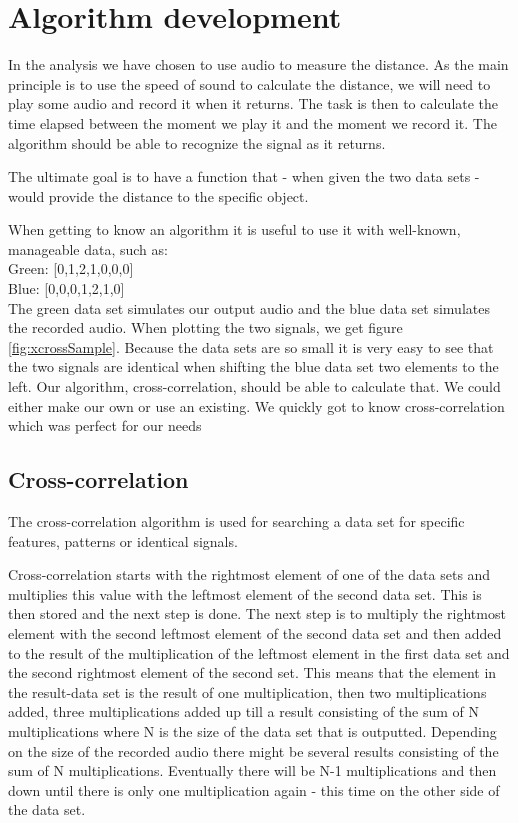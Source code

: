 \chapter{Algorithm development}
In the analysis we have chosen to use audio to measure the distance. As the main principle is to use the speed of sound to calculate the distance, we will need to play some audio and record it when it returns. The task is then to calculate the time elapsed between the moment we play it and the moment we record it. The algorithm should be able to recognize the signal as it returns. 

The ultimate goal is to have a function that - when given the two data sets - would provide the distance to the specific object.

When getting to know an algorithm it is useful to use it with well-known, manageable data, such as:
\\
Green: [0,1,2,1,0,0,0]\\
Blue: [0,0,0,1,2,1,0]\\
The green data set simulates our output audio and the blue data set simulates the recorded audio. When plotting the two signals, we get figure \ref{fig:xcrossSample}. Because the data sets are so small it is very easy to see that the two signals are identical when shifting the blue data set two elements to the left. Our algorithm, cross-correlation, should be able to calculate that. We could either make our own or use an existing. We quickly got to know cross-correlation which was perfect for our needs

\section{Cross-correlation}
The cross-correlation algorithm is used for searching a data set for specific features, patterns or identical signals.

Cross-correlation starts with the rightmost element of one of the data sets and multiplies this value with the leftmost  element of the second data set. This is then stored and the next step is done. The next step is to multiply the rightmost  element with the second leftmost element of the second data set and then added to the result of the multiplication of the  leftmost element in the first data set and the second rightmost element of the second set. This means that the element in the result-data set is the result of one multiplication, then two multiplications added, three multiplications added up till a result consisting of the sum of N multiplications where N is the size of the data set that is outputted. Depending on the size of the recorded audio there might be several results consisting of the sum of N multiplications. Eventually there will be N-1 multiplications and then down until there is only one multiplication again - this time on the other side of the data set.

